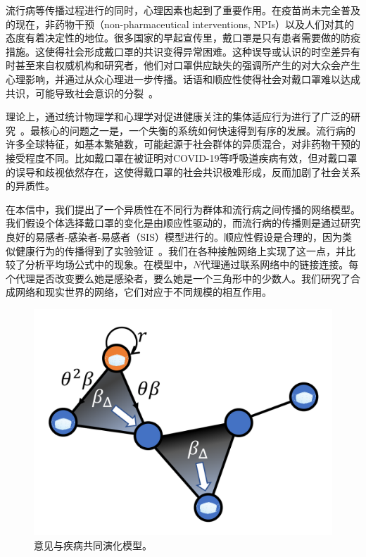 流行病等传播过程进行的同时，心理因素也起到了重要作用。在疫苗尚未完全普及的现在，非药物干预（non-pharmaceutical interventions, NPIs）以及人们对其的态度有着决定性的地位。很多国家的早起宣传里，戴口罩是只有患者需要做的防疫措施。这使得社会形成戴口罩的共识变得异常困难\cite{lai2020effect, van2020face, Adolph2020PandemicPT, hellewell2020feasibility, Wolf2020AwarenessAA, Cheng2020TheRO, eikenberry2020to, erku2020fear, enberg2020covid}。这种误导或认识的时空差异有时甚至来自权威机构和研究者，他们对口罩供应缺失的强调所产生的对大众会产生心理影响\cite{biancovilli2020governments,landi2020should,sugaya2020real,weill2020social}，并通过从众心理进一步传播。话语和顺应性使得社会对戴口罩难以达成共识，可能导致社会意识的分裂~\cite{holme2006nonequilibrium}。

理论上，通过统计物理学和心理学对促进健康关注的集体适应行为进行了广泛的研究~\cite{castellano2009statistical, centola2007complex, centola2010spread, centola2011experimental, christakis2007spread}。最核心的问题之一是，一个失衡的系统如何快速得到有序的发展。流行病的许多全球特征，如基本繁殖数，可能起源于社会群体的异质混合，对非药物干预的接受程度不同。比如戴口罩在被证明对COVID-19等呼吸道疾病有效，但对戴口罩的误导和歧视依然存在，这使得戴口罩的社会共识极难形成，反而加剧了社会关系的异质性。



在本信中，我们提出了一个异质性在不同行为群体和流行病之间传播的网络模型。我们假设个体选择戴口罩的变化是由顺应性驱动的，而流行病的传播则是通过研究良好的易感者-感染者-易感者（SIS）模型进行的。顺应性假设是合理的，因为类似健康行为的传播得到了实验验证~\cite{christakis2008collective, zhang2016support}。我们在各种接触网络上实现了这一点，并比较了分析平均场公式中的现象。在模型中，$N$代理通过联系网络中的链接连接。每个代理是否改变要么她是感染者，要么她是一个三角形中的少数人。我们研究了合成网络和现实世界的网络，它们对应于不同规模的相互作用。

\begin{figure}
    \centering
    \includegraphics[width = 0.7\linewidth]{Figs/masksketch.png}
    \caption{意见与疾病共同演化模型。}
    \label{fig:masksketch}
\end{figure}



